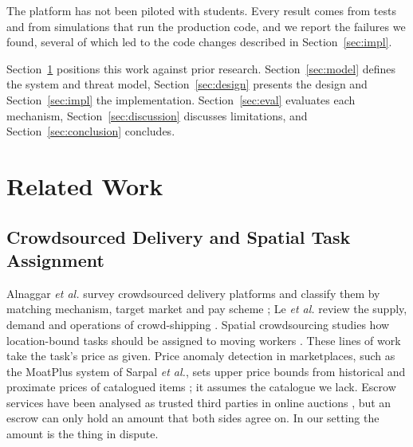 \documentclass[journal]{IEEEtran}
\begin{document}
The platform has not been piloted with students. Every result comes from tests and
from simulations that run the production code, and we report the failures we found,
several of which led to the code changes described in Section~\ref{sec:impl}.

Section~\ref{sec:related} positions this work against prior research.
Section~\ref{sec:model} defines the system and threat model,
Section~\ref{sec:design} presents the design and Section~\ref{sec:impl} the
implementation. Section~\ref{sec:eval} evaluates each mechanism,
Section~\ref{sec:discussion} discusses limitations, and
Section~\ref{sec:conclusion} concludes.

\section{Related Work}\label{sec:related}

\subsection{Crowdsourced Delivery and Spatial Task Assignment}
Alnaggar \emph{et al.} survey crowdsourced delivery platforms and classify them by
matching mechanism, target market and pay scheme \cite{alnaggar2021crowdsourced};
Le \emph{et al.} review the supply, demand and operations of crowd-shipping
\cite{le2019supply}. Spatial crowdsourcing studies how location-bound tasks should
be assigned to moving workers \cite{tong2020spatial,kazemi2012geocrowd}. These lines
of work take the task's price as given. Price anomaly detection in marketplaces,
such as the MoatPlus system of Sarpal \emph{et al.}, sets upper price bounds from
historical and proximate prices of catalogued items \cite{sarpal2023marketplace};
it assumes the catalogue we lack. Escrow services have been analysed as trusted
third parties in online auctions \cite{hu2004hope}, but an escrow can only hold an
amount that both sides agree on. In our setting the amount is the thing in dispute.
\end{document}
